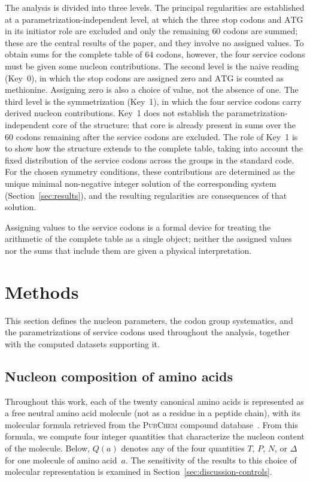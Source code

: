 \documentclass[11pt,a4paper]{article}
\renewcommand{\_}{\origunderscore\allowbreak}
\begin{document}
The analysis is divided into three levels. The principal regularities are established at a parametrization-independent level, at which the three stop codons and $\mathrm{ATG}$ in its initiator role are excluded and only the remaining $60$ codons are summed; these are the central results of the paper, and they involve no assigned values. To obtain sums for the complete table of $64$ codons, however, the four service codons must be given some nucleon contributions. The second level is the naive reading (Key~0), in which the stop codons are assigned zero and $\mathrm{ATG}$ is counted as methionine. Assigning zero is also a choice of value, not the absence of one. The third level is the symmetrization (Key~1), in which the four
service codons carry derived nucleon contributions. Key~1 does not
establish the parametrization-independent core of the structure: that
core is already present in sums over the $60$ codons remaining after
the service codons are excluded. The role of Key~1 is to show how the
structure extends to the complete table, taking into account the fixed
distribution of the service codons across the groups in the standard
code. For the chosen
symmetry conditions, these contributions are determined as the unique
minimal non-negative integer solution of the corresponding system
(Section~\ref{sec:results}), and the resulting regularities are
consequences of that solution.

Assigning values to the service codons is a formal device for treating
the arithmetic of the complete table as a single object; neither the
assigned values nor the sums that include them are given a physical
interpretation.

\section{Methods}
\label{sec:methods}

This section defines the nucleon parameters, the codon
group systematics, and the parametrizations of service
codons used throughout the analysis, together with the
computed datasets supporting it.

\subsection{Nucleon composition of amino acids}
\label{sec:composition}

Throughout this work, each of the twenty canonical amino acids is
represented as a free neutral amino acid molecule (not as a residue in
a peptide chain), with its molecular formula retrieved from the
\textsc{PubChem} compound database~\cite{kim2023}. From this formula,
we compute four integer quantities that characterize the nucleon
content of the molecule. Below, $Q(a)$ denotes any of the four
quantities $T$, $P$, $N$, or $\Delta$ for one molecule of amino
acid~$a$. The sensitivity of the results to this choice of molecular
representation is examined in
Section~\ref{sec:discussion-controls}.
\end{document}
